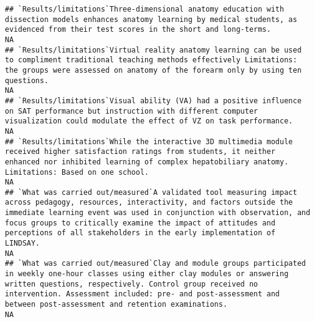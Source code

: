\documentclass[]{article}
\begin{document}
\begin{verbatim}
## `Results/limitations`Three-dimensional anatomy education with dissection models enhances anatomy learning by medical students, as evidenced from their test scores in the short and long-terms.                                                                                                                                                                                                                                                                                         NA
## `Results/limitations`Virtual reality anatomy learning can be used to compliment traditional teaching methods effectively Limitations: the groups were assessed on anatomy of the forearm only by using ten questions.                                                                                                                                                                                                                                                                   NA
## `Results/limitations`Visual ability (VA) had a positive influence on SAT performance but instruction with different computer visualization could modulate the effect of VZ on task performance.                                                                                                                                                                                                                                                                                         NA
## `Results/limitations`While the interactive 3D multimedia module received higher satisfaction ratings from students, it neither enhanced nor inhibited learning of complex hepatobiliary anatomy. Limitations: Based on one school.                                                                                                                                                                                                                                                      NA
## `What was carried out/measured`A validated tool measuring impact across pedagogy, resources, interactivity, and factors outside the immediate learning event was used in conjunction with observation, and focus groups to critically examine the impact of attitudes and perceptions of all stakeholders in the early implementation of LINDSAY.                                                                                                                                       NA
## `What was carried out/measured`Clay and module groups participated in weekly one-hour classes using either clay modules or answering written questions, respectively. Control group received no intervention. Assessment included: pre- and post-assessment and between post-assessment and retention examinations.                                                                                                                                                                     NA

\end{verbatim}
\end{document}
